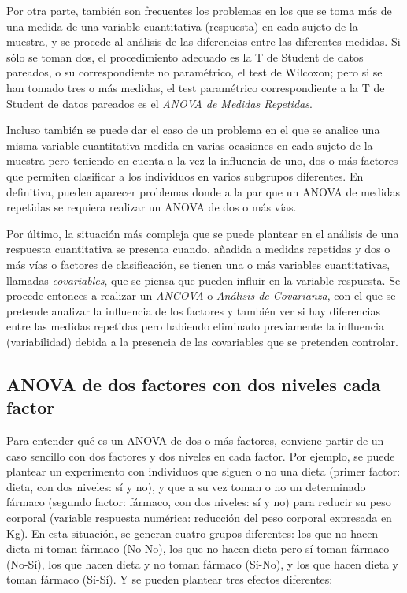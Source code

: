 \documentclass[
  a4paper,
]{scrreport}
\theoremstyle{plain}
\theoremstyle{definition}
\theoremstyle{definition}
\theoremstyle{remark}
\begin{document}
Por otra parte, también son frecuentes los problemas en los que se toma
más de una medida de una variable cuantitativa (respuesta) en cada
sujeto de la muestra, y se procede al análisis de las diferencias entre
las diferentes medidas. Si sólo se toman dos, el procedimiento adecuado
es la T de Student de datos pareados, o su correspondiente no
paramétrico, el test de Wilcoxon; pero si se han tomado tres o más
medidas, el test paramétrico correspondiente a la T de Student de datos
pareados es el \emph{ANOVA de Medidas Repetidas}.

Incluso también se puede dar el caso de un problema en el que se analice
una misma variable cuantitativa medida en varias ocasiones en cada
sujeto de la muestra pero teniendo en cuenta a la vez la influencia de
uno, dos o más factores que permiten clasificar a los individuos en
varios subgrupos diferentes. En definitiva, pueden aparecer problemas
donde a la par que un ANOVA de medidas repetidas se requiera realizar un
ANOVA de dos o más vías.

Por último, la situación más compleja que se puede plantear en el
análisis de una respuesta cuantitativa se presenta cuando, añadida a
medidas repetidas y dos o más vías o factores de clasificación, se
tienen una o más variables cuantitativas, llamadas \emph{covariables},
que se piensa que pueden influir en la variable respuesta. Se procede
entonces a realizar un \emph{ANCOVA} o \emph{Análisis de Covarianza},
con el que se pretende analizar la influencia de los factores y también
ver si hay diferencias entre las medidas repetidas pero habiendo
eliminado previamente la influencia (variabilidad) debida a la presencia
de las covariables que se pretenden controlar.

\subsection{ANOVA de dos factores con dos niveles cada
factor}\label{anova-de-dos-factores-con-dos-niveles-cada-factor}

Para entender qué es un ANOVA de dos o más factores, conviene partir de
un caso sencillo con dos factores y dos niveles en cada factor. Por
ejemplo, se puede plantear un experimento con individuos que siguen o no
una dieta (primer factor: dieta, con dos niveles: sí y no), y que a su
vez toman o no un determinado fármaco (segundo factor: fármaco, con dos
niveles: sí y no) para reducir su peso corporal (variable respuesta
numérica: reducción del peso corporal expresada en Kg). En esta
situación, se generan cuatro grupos diferentes: los que no hacen dieta
ni toman fármaco (No-No), los que no hacen dieta pero sí toman fármaco
(No-Sí), los que hacen dieta y no toman fármaco (Sí-No), y los que hacen
dieta y toman fármaco (Sí-Sí). Y se pueden plantear tres efectos
diferentes:
\end{document}
